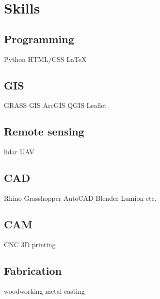 \documentclass[]{baharmon_cv}
\begin{document}
\section{Skills}
\normalsize{
\begin{minipage}[t]{0.3\textwidth} 
\subsection{Programming}
\vspace*{0.1cm}
Python \textbullet{} HTML/CSS \textbullet{} \LaTeX\ \\ 
\linespread{0.1}
%
\subsection{GIS}
\vspace*{0.1cm}
GRASS GIS \textbullet{} ArcGIS \textbullet{} QGIS \textbullet{} Leaflet \\ %
\linespread{0.1}
%
\subsection{Remote sensing}
\vspace*{0.1cm}
lidar \textbullet{} UAV \\ 
\linespread{0.1}
\end{minipage} 
%
\hfill
%
\begin{minipage}[t]{0.33\textwidth} 
\subsection{CAD}
\vspace*{0.1cm}
Rhino \textbullet{} Grasshopper \textbullet{} AutoCAD \textbullet{} Blender \textbullet{} Lumion \textbullet{} etc. \\ 
\linespread{0.1}
%
\subsection{CAM}
\vspace*{0.1cm}
CNC \textbullet{} 3D printing \\ 
\linespread{0.1}
%
\subsection{Fabrication}
\vspace*{0.1cm}
woodworking \textbullet{} metal casting \\ 
\linespread{0.1}
\end{minipage} 
%
\hfill
%
\begin{minipage}[t]{0.2\textwidth} 

\end{minipage}}
\end{document}
